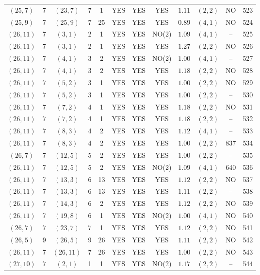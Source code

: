 \begin{longtable}{|c|c|c|c|c|c|c|c|c|c|c|c|}
$(25,7)$ & 7 & $(23,7)$ & 7 & 1 & YES & YES & YES & $1.11$ & $(2,2)$ & NO & 523\\
$(25,9)$ & 7 & $(25,9)$ & 7 & 25 & YES & YES & YES & $0.89$ & $(4,1)$ & NO & 524\\
$(26,11)$ & 7 & $(3,1)$ & 2 & 1 & YES & YES & NO(2) & $1.09$ & $(4,1)$ & -- & 525\\
$(26,11)$ & 7 & $(3,1)$ & 2 & 1 & YES & YES & YES & $1.27$ & $(2,2)$ & NO & 526\\
$(26,11)$ & 7 & $(4,1)$ & 3 & 2 & YES & YES & NO(2) & $1.00$ & $(4,1)$ & -- & 527\\
$(26,11)$ & 7 & $(4,1)$ & 3 & 2 & YES & YES & YES & $1.18$ & $(2,2)$ & NO & 528\\
$(26,11)$ & 7 & $(5,2)$ & 3 & 1 & YES & YES & YES & $1.00$ & $(2,2)$ & NO & 529\\
$(26,11)$ & 7 & $(5,2)$ & 3 & 1 & YES & YES & YES & $1.00$ & $(2,2)$ & -- & 530\\
$(26,11)$ & 7 & $(7,2)$ & 4 & 1 & YES & YES & YES & $1.18$ & $(2,2)$ & NO & 531\\
$(26,11)$ & 7 & $(7,2)$ & 4 & 1 & YES & YES & YES & $1.18$ & $(2,2)$ & -- & 532\\
$(26,11)$ & 7 & $(8,3)$ & 4 & 2 & YES & YES & YES & $1.12$ & $(4,1)$ & -- & 533\\
$(26,11)$ & 7 & $(8,3)$ & 4 & 2 & YES & YES & YES & $1.00$ & $(2,2)$ & 837 & 534\\
$(26,7)$ & 7 & $(12,5)$ & 5 & 2 & YES & YES & YES & $1.00$ & $(2,2)$ & -- & 535\\
$(26,11)$ & 7 & $(12,5)$ & 5 & 2 & YES & YES & NO(2) & $1.09$ & $(4,1)$ & 640 & 536\\
$(26,11)$ & 7 & $(13,3)$ & 6 & 13 & YES & YES & YES & $1.12$ & $(2,2)$ & NO & 537\\
$(26,11)$ & 7 & $(13,3)$ & 6 & 13 & YES & YES & YES & $1.11$ & $(2,2)$ & -- & 538\\
$(26,11)$ & 7 & $(14,3)$ & 6 & 2 & YES & YES & YES & $1.12$ & $(2,2)$ & NO & 539\\
$(26,11)$ & 7 & $(19,8)$ & 6 & 1 & YES & YES & NO(2) & $1.00$ & $(4,1)$ & NO & 540\\
$(26,7)$ & 7 & $(23,7)$ & 7 & 1 & YES & YES & YES & $1.12$ & $(2,2)$ & NO & 541\\
$(26,5)$ & 9 & $(26,5)$ & 9 & 26 & YES & YES & YES & $1.11$ & $(2,2)$ & NO & 542\\
$(26,11)$ & 7 & $(26,11)$ & 7 & 26 & YES & YES & YES & $1.00$ & $(2,2)$ & NO & 543\\
$(27,10)$ & 7 & $(2,1)$ & 1 & 1 & YES & YES & NO(2) & $1.17$ & $(2,2)$ & -- & 544\\

\end{longtable}
